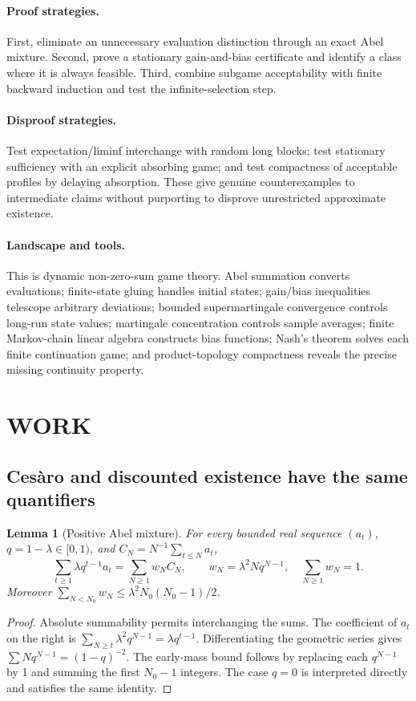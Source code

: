\documentclass[11pt,a4paper]{article}
\newtheorem{lemma}[theorem]{Lemma}
\theoremstyle{definition}
\theoremstyle{remark}
\begin{document}
\paragraph{Proof strategies.}
First, eliminate an unnecessary evaluation distinction through an exact Abel mixture. Second, prove a stationary gain-and-bias certificate and identify a class where it is always feasible. Third, combine subgame acceptability with finite backward induction and test the infinite-selection step.

\paragraph{Disproof strategies.}
Test expectation/liminf interchange with random long blocks; test stationary sufficiency with an explicit absorbing game; and test compactness of acceptable profiles by delaying absorption. These give genuine counterexamples to intermediate claims without purporting to disprove unrestricted approximate existence.

\paragraph{Landscape and tools.}
This is dynamic non-zero-sum game theory. Abel summation converts evaluations; finite-state gluing handles initial states; gain/bias inequalities telescope arbitrary deviations; bounded supermartingale convergence controls long-run state values; martingale concentration controls sample averages; finite Markov-chain linear algebra constructs bias functions; Nash's theorem solves each finite continuation game; and product-topology compactness reveals the precise missing continuity property.

\section{WORK}
\subsection{Ces\`aro and discounted existence have the same quantifiers}
\begin{lemma}[Positive Abel mixture]
For every bounded real sequence $(a_t)$, $q=1-\lambda\in[0,1)$, and $C_N=N^{-1}\sum_{t\leq N}a_t$,
\[
 \sum_{t\geq1}\lambda q^{t-1}a_t
 =\sum_{N\geq1}w_N C_N,
 \qquad w_N=\lambda^2Nq^{N-1},\quad \sum_{N\geq1}w_N=1.
\]
Moreover $\sum_{N<N_0}w_N\leq\lambda^2N_0(N_0-1)/2$.
\end{lemma}
\begin{proof}
Absolute summability permits interchanging the sums. The coefficient of $a_t$ on the right is
$\sum_{N\geq t}\lambda^2q^{N-1}=\lambda q^{t-1}$. Differentiating the geometric series gives $\sum Nq^{N-1}=(1-q)^{-2}$. The early-mass bound follows by replacing each $q^{N-1}$ by 1 and summing the first $N_0-1$ integers. The case $q=0$ is interpreted directly and satisfies the same identity.
\end{proof}
\end{document}
